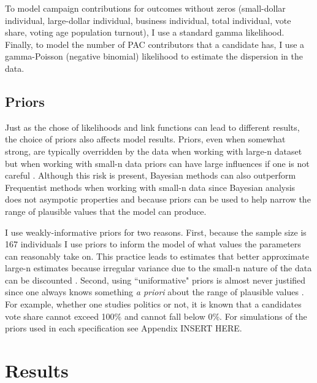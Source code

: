 \documentclass[12pt]{article}
\begin{document}
To model campaign contributions for outcomes without zeros (small-dollar individual, large-dollar individual, business individual, total individual, vote share, voting age population turnout), I use a standard gamma likelihood. Finally, to model the number of PAC contributors that a candidate has, I use a gamma-Poisson (negative binomial) likelihood to estimate the dispersion in the data. 

\subsection{Priors}

Just as the chose of likelihoods and link functions can lead to different results, the choice of priors also affects model results. Priors, even when somewhat strong, are typically overridden by the data when working with large-n dataset but when working with small-n data priors can have large influences if one is not careful \citep{mcneish_using_2016}. Although this risk is present, Bayesian methods can also outperform Frequentist methods when working with small-n data since Bayesian analysis does not asympotic properties and because priors can be used to help narrow the range of plausible values that the model can produce. 

I use weakly-informative priors for two reasons. First, because the sample size is 167 individuals I use priors to inform the model of what values the parameters can reasonably take on. This practice leads to estimates that better approximate large-n estimates because irregular variance due to the small-n nature of the data can be discounted \citep{mcneish_using_2016}. Second, using ``uniformative" priors is almost never justified since one always knows something \textit{a priori} about the range of plausible values \citep{gelman_weakly_2008}. For example, whether one studies politics or not, it is known that a candidates vote share cannot exceed 100\% and cannot fall below 0\%. For simulations of the priors used in each specification see Appendix INSERT HERE.


\section{Results}
\end{document}
